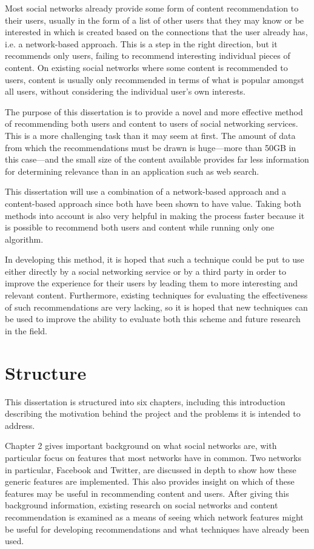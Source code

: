 Most social networks already provide some form of content recommendation to their users, usually in the form of a list of other users that they may know or be interested in which is created based on the connections that the user already has, i.e. a network-based approach. This is a step in the right direction, but it recommends only users, failing to recommend interesting individual pieces of content. On existing social networks where some content is recommended to users, content is usually only recommended in terms of what is popular amongst all users, without considering the individual user's own interests.

The purpose of this dissertation is to provide a novel and more effective method of recommending both users and content to users of social networking services. This is a more challenging task than it may seem at first. The amount of data from which the recommendations must be drawn is huge---more than 50GB in this case---and the small size of the content available provides far less information for determining relevance than in an application such as web search.

This dissertation will use a combination of a network-based approach and a content-based approach since both have been shown to have value. Taking both methods into account is also very helpful in making the process faster because it is possible to recommend both users and content while running only one algorithm.

In developing this method, it is hoped that such a technique could be put to use either directly by a social networking service or by a third party in order to improve the experience for their users by leading them to more interesting and relevant content. Furthermore, existing techniques for evaluating the effectiveness of such recommendations are very lacking, so it is hoped that new techniques can be used to improve the ability to evaluate both this scheme and future research in the field.

\section{Structure}

This dissertation is structured into six chapters, including this introduction describing the motivation behind the project and the problems it is intended to address.

Chapter 2 gives important background on what social networks are, with particular focus on features that most networks have in common. Two networks in particular, Facebook and Twitter, are discussed in depth to show how these generic features are implemented. This also provides insight on which of these features may be useful in recommending content and users. After giving this background information, existing research on social networks and content recommendation is examined as a means of seeing which network features might be useful for developing recommendations and what techniques have already been used.

